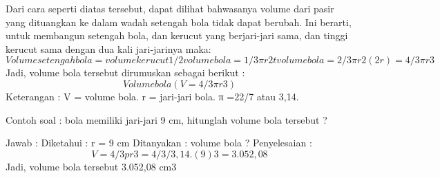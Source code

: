 Dari cara seperti diatas tersebut, dapat dilihat bahwasanya volume dari pasir yang dituangkan ke dalam wadah setengah bola tidak dapat berubah. Ini berarti, untuk membangun setengah bola, dan kerucut yang berjari-jari sama, dan tinggi kerucut sama dengan dua kali jari-jarinya maka:
\begin{equation}
Volume setengah bola = volume kerucut
1/2 volume bola = 1/3 πr2t
volume bola = 2/3πr2(2r)
                         = 4/3πr3
\end{equation}
Jadi, volume bola tersebut dirumuskan sebagai berikut :
\begin{equation}
Volume bola ( V = 4/3πr3 )
\end{equation}
Keterangan :
V = volume bola.
r = jari-jari bola.
π =22/7 atau 3,14.

Contoh soal :
bola memiliki jari-jari 9 cm, hitunglah volume bola tersebut ?

Jawab :
Diketahui : r = 9 cm
Ditanyakan : volume bola ?
Penyelesaian :
\begin{equation}
V   = 4/3pr3
    = 4/3/ 3 , 14 . (9)3
    = 3.052,08
\end{equation}
Jadi, volume bola tersebut 3.052,08 cm3
